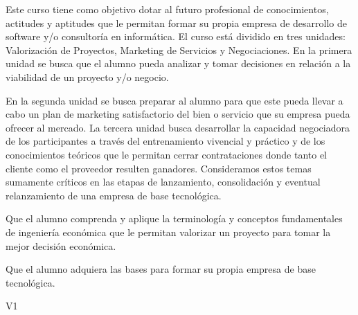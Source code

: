 \begin{syllabus}


\begin{justification}
Este curso tiene como objetivo dotar al futuro profesional de conocimientos, actitudes y aptitudes que le permitan formar su propia empresa de desarrollo de software y/o consultoría en informática. El curso está dividido en tres unidades: Valorización de Proyectos, Marketing de Servicios y Negociaciones. En la primera unidad se busca que el alumno pueda analizar y tomar decisiones en relación a la viabilidad de un proyecto y/o negocio.

En la segunda unidad se busca preparar al alumno para que este pueda llevar a cabo un plan de marketing satisfactorio del bien o servicio que su empresa pueda ofrecer al mercado. La tercera unidad busca desarrollar la capacidad negociadora de los participantes a través del entrenamiento vivencial y práctico y de los conocimientos teóricos que le permitan cerrar contrataciones donde tanto el cliente como el proveedor resulten ganadores. Consideramos estos temas sumamente críticos en las etapas de lanzamiento, consolidación y eventual relanzamiento de una empresa de base tecnológica.
\end{justification}

\begin{goals}
\item Que el alumno comprenda y aplique la terminología y conceptos fundamentales de ingeniería económica que le permitan valorizar un proyecto para tomar la mejor decisión económica.
\item Que el alumno adquiera las bases para formar su propia empresa de base tecnológica.
\end{goals}

\begin{outcomes}{V1}
    \item {}
    \item {}
    \item {}
\end{outcomes}

\begin{competences}
    \item {} 
    \item {}
    \item {}
    \item {}
    \item {}
    \item {}
    \item {}
    \item {}
\end{competences}


\end{syllabus}
